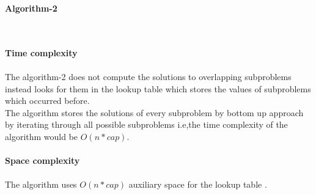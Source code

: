 \documentclass[twocolumn]{article}
\begin{document}
\centerline{\textbf{Algorithm-2}}\\
\\

\textbf{Time complexity}\\
\\
The algorithm-2 does not compute the solutions to overlapping subproblems instead looks for them in the lookup table which stores the values of subproblems which occurred before.
\\
The algorithm stores the solutions  of every subproblem by bottom up approach by iterating through all possible subproblems i.e,the time complexity of the algorithm would be $O(n*cap)$.\\
\\
\vfill\eject
\textbf{Space complexity}\\
\\
The algorithm uses $O(n*cap)$ auxiliary space for the lookup table .\\
\end{document}
